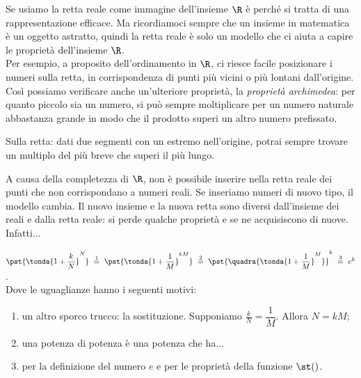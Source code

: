 Se usiamo la retta reale come immagine dell'insieme \(\R\) è perché
si tratta di una rappresentazione efficace. Ma ricordiamoci sempre che un 
insieme in matematica è un oggetto astratto, quindi la retta reale è solo
un modello che ci aiuta a capire le proprietà dell'insieme \(\R\).\\
Per esempio, a proposito dell'ordinamento in \(\R\), ci riesce facile
posizionare i numeri sulla retta, in corrispondenza di punti più vicini o 
più lontani dall'origine. 
Così possiamo verificare anche un'ulteriore proprietà, 
la \emph{proprietà archimedea}: per quanto piccolo sia un numero, si 
può sempre moltiplicare per un numero naturale abbastanza grande in modo 
che il prodotto superi un altro numero prefissato.

Sulla retta: dati due segmenti con un estremo nell'origine, potrai sempre 
trovare un  multiplo del più breve che superi il più lungo.

A causa della completezza di \(\R\), non è possibile inserire
nella retta reale dei punti che non corrispondano a numeri reali. Se 
inseriamo numeri di nuovo tipo, il modello cambia. Il nuovo insieme e la 
nuova retta sono diversi dall'insieme dei reali e dalla retta reale: si 
perde qualche proprietà e se ne acquisiscono di nuove.
Infatti...


\newpage %



\begin{esempio}
\(\pst{\tonda{1+\dfrac{k}{N}}^N}
~ \stackrel{1}{=} ~  
\pst{\tonda{1+\dfrac{1}{M}}^{kM}}
~ \stackrel{2}{=} ~
\pst{\quadra{\tonda{1+\dfrac{1}{M}}^M}}^k
~ \stackrel{3}{=} ~ e^k\).\\

Dove le uguaglianze hanno i seguenti motivi:
\begin{enumerate} [nosep]
 \item un altro sporco trucco: la sostituzione. Supponiamo
\(\frac{k}{N}=\dfrac{1}{M}\). Allora \(N=kM\);
 \item una potenza di potenza è una potenza che ha...
 \item per la definizione del numero \(e\) e per le proprietà della 
funzione 
\(\st()\).
\end{enumerate}
\end{esempio}

